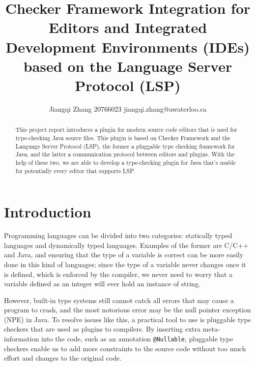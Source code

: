 \documentclass{article}
\begin{document}


\title{Checker Framework Integration for Editors and Integrated Development
  Environments (IDEs) based on the Language Server Protocol (LSP)}
\author{Jiangqi Zhang 20766023 jiangqi.zhang@uwaterloo.ca}
\date{}

\maketitle

\thispagestyle{plain}
\setcounter{page}{1}

\begin{abstract}
This project report introduces a plugin for modern source code editors that is
used for type-checking Java source files. This plugin is based on Checker
Framework\cite{cf} and the Language Server Protocol (LSP)\cite{lsp}, the former
a pluggable type checking framework for Java, and the latter a communication
protocol between editors and plugins. With the help of these two, we are able to
develop a type-checking plugin for Java that's usable for potentially every
editor that supports LSP.
\end{abstract}

\section{Introduction}


Programming languages can be divided into two categories: statically typed
languages and dynamically typed languages. Examples of the former are C/C++ and
Java, and ensuring that the type of a variable is correct can be more easily
done in this kind of languages; since the type of a variable never changes once
it is defined, which is enforced by the compiler, we never need to worry that a
variable defined as an integer will ever hold an instance of string.

However, built-in type systems still cannot catch all errors that may cause a
program to crash, and the most notorious error may be the null pointer exception
(NPE) in Java. To resolve issues like this, a practical tool to use is pluggable
type checkers\cite{cf-ori} that are used as plugins to compilers. By inserting
extra meta-information into the code, such as an annotation \verb|@Nullable|,
pluggable type checkers enable us to add more constraints to the source code
without too much effort and changes to the original code.
\end{document}
